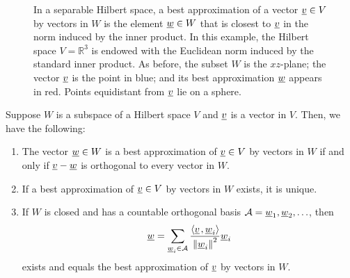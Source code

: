 \begin{figure}[hbt]
\centering{}
\caption{In a separable Hilbert space, a best approximation of a vector $\underline{v} \in V$ by vectors in $W$ is the element $\underline{w} \in W$ that is closest to $\underline{v}$ in the norm induced by the inner product.
In this example, the Hilbert space $V=\mathbb{R}^3$ is endowed with the Euclidean norm induced by the standard inner product.
As before, the subset $W$ is the $xz$-plane; the vector $\underline{v}$ is the point in blue; and its best approximation $\underline{w}$ appears in red.
Points equidistant from $\underline{v}$ lie on a sphere.}
\label{fig:AR-Hilbert1}
\end{figure}

\begin{theorem} \label{theorem:OrthogonalProjection}
Suppose $W$ is a subspace of a Hilbert space $V$ and $\underline{v}$ is a vector in $V$.
Then, we have the following:
\begin{enumerate}
\item The vector $\underline{w} \in W$ is a best approximation of $\underline{v} \in V$ by vectors in $W$ if and only if $\underline{v} - \underline{w}$ is orthogonal to every vector in $W$.
\item If a best approximation of $\underline{v} \in V$ by vectors in $W$ exists, it is unique.
\item If $W$ is closed and has a countable orthogonal basis $\mathcal{A} = \underline{w}_1, \underline{w}_2, \ldots$, then
\begin{equation}
\label{equation:OrthogonalProjectionOrthogonalVectors}
\underline{w} = \sum_{\underline{w}_i \in \mathcal{A}} \frac{ {\left\langle  \underline{v}  \mskip2mu , \underline{w}_i \right\rangle} }{ \left\| \underline{w}_i \right\|^2 } \underline{w}_i
\end{equation}
exists and equals the best approximation of $\underline{v}$ by vectors in $W$.
\end{enumerate}
\end{theorem}
